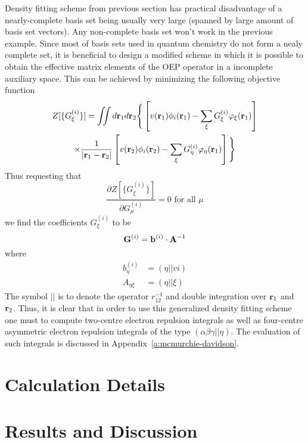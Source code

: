 Density fitting scheme from previous section has practical disadvantage of a nearly-complete basis set
being usually very large (spanned by large amount of basis set vectors). Any non-complete basis set
won't work in the previous example. Since most of basis sets used in quantum chemistry do not form a nealy complete
set, it is beneficial to design a modified scheme in which it is possible to obtain the effective 
matrix elements of the OEP operator in a incomplete auxiliary space. This can be achieved by minimizing 
the following objective function
\begin{multline}
	Z[\{G^{(i)}_\xi\}] = \iint d{\bf r}_1 d{\bf r}_2 \Bigg\{
                     \left[    v({\bf r}_1) \phi_i({\bf r}_1) - \sum_\xi G^{(i)}_\xi \varphi_\xi({\bf r}_1) \right]
                  \\ \times \frac{1}{\vert {\bf r}_1 - {\bf r}_2 \vert}  
                     \left[    v({\bf r}_2) \phi_i({\bf r}_2) - \sum_\xi G^{(i)}_\eta\varphi_\eta({\bf r}_1) \right]
		    \Bigg\}
\end{multline}
Thus requesting that 
\begin{equation}
 \frac{\partial Z[\{G^{(i)}_\xi\}]}{\partial G^{(i)}_\mu} = 0 \text{ for all $\mu$}
\end{equation}
we find the coefficients $ G^{(i)}_\xi $ to be
\begin{equation}
 {\bf G}^{(i)} = {\bf b}^{(i)} \cdot {\bf A}^{-1}
\end{equation}
where 
\begin{align}
 b^{(i)}_\eta &= (\eta \vert\vert vi) \\
 A_{\eta\xi}  &= (\eta \vert\vert \xi)
\end{align}
The symbol $ \vert\vert $ is to denote the operator $ r_{12}^{-1}$ and double integration over $ {\bf r}_1 $
and $ {\bf r}_2 $. Thus, it is clear that in order to use this generalized density fitting scheme
one must to compute two\hyp{}centre electron repulsion integrals
as well as four\hyp{}centre asymmetric electron repulsion integrals of the type $ (\alpha\beta\gamma||\eta) $.
The evaluation of such integrals is discussed in Appendix~\ref{a:mcmurchie-davidson}.



\section{\label{s:3}Calculation Details}
\section{\label{s:4}Results and Discussion}
